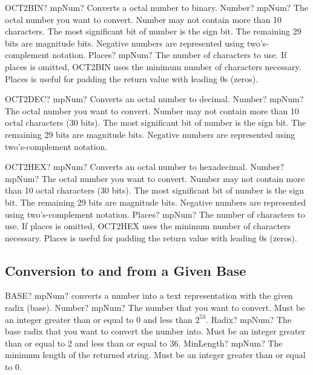 \begin{mpFunctionsExtract}
	\mpWorksheetFunctionTwoNotImplemented
	{OCT2BIN? mpNum? Converts a octal number to binary.}
	{Number? mpNum? The octal number you want to convert. Number may not contain more than 10 characters. The most significant bit of number is the sign bit. The remaining 29 bits are magnitude bits. Negative numbers are represented using two's-complement notation.}
	{Places? mpNum? The number of characters to use. If places is omitted, OCT2BIN uses the minimum number of characters necessary. Places is useful for padding the return value with leading 0s (zeros).}
\end{mpFunctionsExtract}


\vspace{0.6cm}
\begin{mpFunctionsExtract}
	\mpWorksheetFunctionOneNotImplemented
	{OCT2DEC? mpNum? Converts an octal number to decimal.}
	{Number? mpNum? The octal number you want to convert. Number may not contain more than 10 octal characters (30 bits). The most significant bit of number is the sign bit. The remaining 29 bits are magnitude bits. Negative numbers are represented using two's-complement notation.}
\end{mpFunctionsExtract}


\vspace{0.6cm}
\begin{mpFunctionsExtract}
	\mpWorksheetFunctionTwoNotImplemented
	{OCT2HEX? mpNum? Converts an octal number to hexadecimal.}
	{Number? mpNum? The octal number you want to convert. Number may not contain more than 10 octal characters (30 bits). The most significant bit of number is the sign bit. The remaining 29 bits are magnitude bits. Negative numbers are represented using two's-complement notation.}
	{Places? mpNum? The number of characters to use. If places is omitted, OCT2HEX uses the minimum number of characters necessary. Places is useful for padding the return value with leading 0s (zeros).}
\end{mpFunctionsExtract}



\subsection{Conversion to and from a Given Base}


\begin{mpFunctionsExtract}
	\mpWorksheetFunctionThree
	{BASE? mpNum? converts a number into a text representation with the given radix (base).}
	{Number? mpNum? The number that you want to convert. Must be an integer greater than or equal to 0 and less than $2^53$.}
	{Radix? mpNum? The base radix that you want to convert the number into. Must be an integer greater than or equal to 2 and less than or equal to 36.}
	{MinLength? mpNum? The minimum length of the returned string. Must be an integer greater than or equal to 0.}
\end{mpFunctionsExtract}


